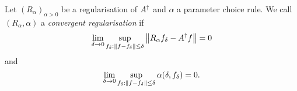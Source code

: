 \begin{definition}
	Let $(R_\alpha)_{\alpha > 0}$ be a regularisation of $A^\dagger$ and $\alpha$ a parameter choice rule. We call $(R_\alpha, \alpha)$ a \emph{convergent regularisation} if
	\[
	\lim_{\delta \to 0} \sup_{f_\delta : \norm{f - f_\delta} \leq \delta} \norm{R_\alpha f_\delta - A^\dagger f} = 0
	\]
	and
	\[
	\lim_{\delta \to 0} \sup_{f_\delta : \norm{f - f_\delta} \leq \delta} \alpha(\delta, f_\delta) = 0. 
	\]
\end{definition}